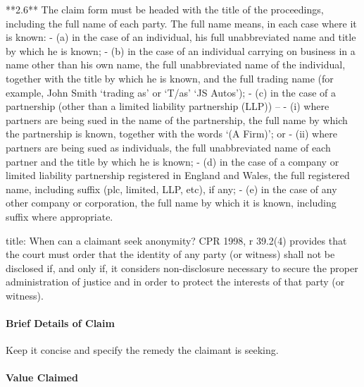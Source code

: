 \documentclass[
]{article}
\newenvironment{Shaded}{}{}
\newcommand{\NormalTok}[1]{#1}
\begin{document}
\begin{Shaded}
\begin{Highlighting}[]
\NormalTok{**2.6** The claim form must be headed with the title of the proceedings, including the full name of each party. The full name means, in each case where it is known:}
\NormalTok{{-} (a) in the case of an individual, his full unabbreviated name and title by which he is known;}
\NormalTok{{-} (b) in the case of an individual carrying on business in a name other than his own name, the full unabbreviated name of the individual, together with the title by which he is known, and the full trading name (for example, John Smith ‘trading as’ or ‘T/as’ ‘JS Autos’);}
\NormalTok{{-} (c) in the case of a partnership (other than a limited liability partnership (LLP)) –}
\NormalTok{    {-} (i) where partners are being sued in the name of the partnership, the full name by which the partnership is known, together with the words ‘(A Firm)’; or}
\NormalTok{    {-} (ii) where partners are being sued as individuals, the full unabbreviated name of each partner and the title by which he is known;}
\NormalTok{{-} (d) in the case of a company or limited liability partnership registered in England and Wales, the full registered name, including suffix (plc, limited, LLP, etc), if any;}
\NormalTok{{-} (e) in the case of any other company or corporation, the full name by which it is known, including suffix where appropriate.}
\end{Highlighting}
\end{Shaded}

\begin{Shaded}
\begin{Highlighting}[]
\NormalTok{title: When can a claimant seek anonymity?}
\NormalTok{CPR 1998, r 39.2(4) provides that the court must order that the identity of any party (or witness) shall not be disclosed if, and only if, it considers non{-}disclosure necessary to secure the proper administration of justice and in order to protect the interests of that party (or witness).}
\end{Highlighting}
\end{Shaded}

\hypertarget{brief-details-of-claim}{%
\paragraph{Brief Details of Claim}\label{brief-details-of-claim}}

Keep it concise and specify the remedy the claimant is seeking.

\hypertarget{value-claimed}{%
\paragraph{Value Claimed}\label{value-claimed}}
\end{document}
